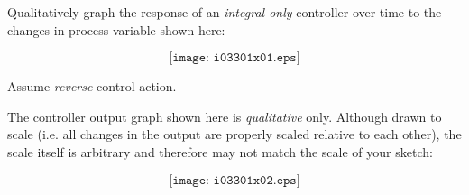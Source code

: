 

Qualitatively graph the response of an {\it integral-only} controller over time to the changes in process variable shown here:

$$\texttt{[image: i03301x01.eps]}$$

Assume {\it reverse} control action.







The controller output graph shown here is {\it qualitative} only.  Although drawn to scale (i.e. all changes in the output are properly scaled relative to each other), the scale itself is arbitrary and therefore may not match the scale of your sketch:

$$\texttt{[image: i03301x02.eps]}$$











